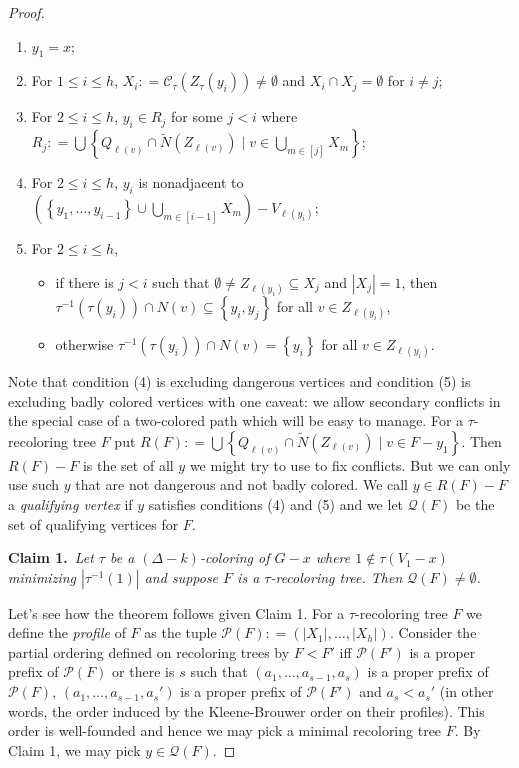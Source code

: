 \documentclass[12pt]{article}
\theoremstyle{plain}
\theoremstyle{definition}
\theoremstyle{remark}
\newcommand{\fancy}[1]{\mathcal{#1}}
\newcommand{\set}[1]{\left\{ #1 \right\}}
\newcommand{\setbs}[2]{\left\{ #1 \mid #2 \right\}}
\newcommand{\card}[1]{\left|#1\right|}
\newcommand{\irange}[1]{\left[#1\right]}
\newcommand{\parens}[1]{\left( #1 \right)}
\newcommand{\nint}[1]{\widetilde{N}\left(#1\right)}
\newcommand{\DefinedAs}{\mathrel{\mathop:}=}
\newcommand{\claim}[2]{{\bf Claim #1.}~{\it #2}~~}
\begin{document}
\begin{proof}
\begin{enumerate}
\item $y_1 = x$;
\item For $1 \le i \le h$, $X_i \DefinedAs \fancy{C}_\tau\parens{Z_{\tau}(y_i)} \ne \emptyset$ and $X_i \cap X_j = \emptyset$ for $i \neq j$;
\item For $2 \le i \le h$, $y_i \in R_j$ for some $j < i$ where $R_j \DefinedAs \bigcup \setbs{Q_{\ell(v)} \cap \nint{Z_{\ell(v)}}}{v \in \bigcup_{m \in \irange{j}} X_m}$;
\item For $2 \le i \le h$, $y_i$ is nonadjacent to $\parens{\set{y_1, \ldots, y_{i-1}} \cup \bigcup_{m \in \irange{i-1}} X_m} - V_{\ell(y_i)}$;
\item For $2 \le i \le h$, 
\begin{itemize}
\item if there is $j < i$ such that $\emptyset \ne Z_{\ell(y_i)} \subseteq X_j$ and $\card{X_j} = 1$, then $\tau^{-1}(\tau(y_i)) \cap N(v) \subseteq \set{y_i, y_j}$ for all $v \in Z_{\ell(y_i)}$,
\item otherwise $\tau^{-1}(\tau(y_i)) \cap N(v) = \set{y_i}$ for all $v \in Z_{\ell(y_i)}$.
\end{itemize}
\end{enumerate}

Note that condition (4) is excluding dangerous vertices and condition (5) is excluding badly colored vertices with one caveat: we allow secondary conflicts in the special case of a two-colored path which will be easy to manage.  For a $\tau$-recoloring tree $F$ put $R(F) \DefinedAs  \bigcup \setbs{Q_{\ell(v)} \cap \nint{Z_{\ell(v)}}}{v \in F - y_1}$.  Then $R(F) - F$ is the set of all $y$ we might try to use to fix conflicts.  But we can only use such $y$ that are not dangerous and not badly colored.  We call $y \in R(F) - F$ a \emph{qualifying vertex} if $y$ satisfies conditions (4) and (5) and we let $\fancy{Q}(F)$ be the set of qualifying vertices for $F$.

\claim{1}{Let $\tau$ be a $(\Delta - k)$-coloring of $G-x$ where $1 \not \in \tau(V_1 - x)$ minimizing $\card{\tau^{-1}(1)}$ and suppose $F$ is a $\tau$-recoloring tree. Then $\fancy{Q}(F) \ne \emptyset$.}

\bigskip

Let's see how the theorem follows given Claim 1.  For a $\tau$-recoloring tree $F$ we define the \emph{profile} of $F$ as the tuple $\fancy{P}(F) \DefinedAs \parens{|X_1|, \ldots, |X_h|}$.  Consider the partial ordering defined on recoloring trees by $F < F'$ iff $\fancy{P}(F')$ is a proper prefix of $\fancy{P}(F)$ or there is $s$ such that $\parens{a_1, \ldots, a_{s-1}, a_s}$ is a proper prefix of $\fancy{P}(F)$, $\parens{a_1, \ldots, a_{s-1}, a_s'}$ is a proper prefix of $\fancy{P}(F')$ and $a_s < a_s'$ (in other words, the order induced by the Kleene-Brouwer order on their profiles).  This order is well-founded and hence we may pick a minimal recoloring tree $F$.  By Claim 1, we may pick $y \in \fancy{Q}(F)$.  


\end{proof}
\end{document}
